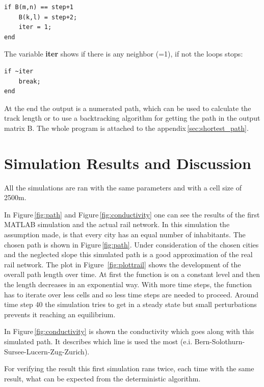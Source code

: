 \documentclass[11pt]{scrartcl}
\begin{document}
\begin{lstlisting}
if B(m,n) == step+1
	B(k,l) = step+2;
	iter = 1;
end
\end{lstlisting}

\null

The variable \textbf{iter} shows if there is any neighbor (=1), if not the loops stops:

\begin{lstlisting}
if ~iter
	break;
end
\end{lstlisting}

\null

At the end the output is a numerated path, which can be used to calculate the track length or to use a backtracking algorithm for getting the path in the output matrix B. The whole program is attached to the appendix\,\ref{sec:shortest_path}.


\pagebreak
\section{Simulation Results and Discussion}
\label{sec:results}
All the simulations are ran with the same parameters and with a cell size of 2500m.

In Figure\,\ref{fig:path} and Figure\,\ref{fig:conductivity} one can see the results of the first MATLAB simulation and the actual rail network. In this simulation the assumption made, is that every city has an equal number of inhabitants. The chosen path is shown in Figure\,\ref{fig:path}. Under consideration of the chosen cities and the neglected slope this simulated path is a good approximation of the real rail network. The plot in Figure \,\ref{fig:plottrail} shows the development of the overall path length over time. At first the function is on a constant level and then the length decreases in an exponential way. With more time steps,  the function has to iterate over less cells and so less time steps are needed to proceed. Around time step 40 the simulation tries to get in a steady state but small perturbations prevents it reaching an equilibrium.

In Figure\,\ref{fig:conductivity} is shown the conductivity which goes along with this simulated path. It describes which line is used the most (e.i. Bern-Solothurn-Sursee-Lucern-Zug-Zurich).

For verifying the result this first simulation rans twice, each time with the same result, what can be expected from the deterministic algorithm.
\end{document}
